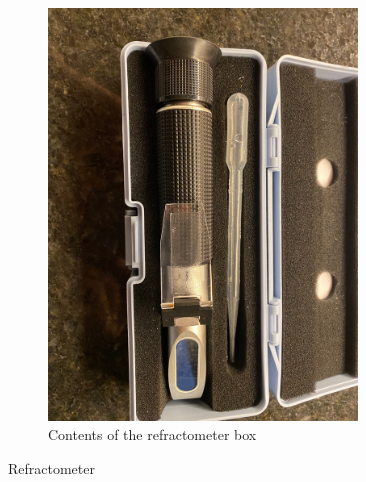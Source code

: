 \documentclass{report}
\begin{document}
\begin{enumerate}
\begin{enumerate}[I]
\begin{figure}[H]
\begin{subfigure}{0.5\textwidth}
                \includegraphics[width=0.9\textwidth]{RefractometerInBox.jpg}
                \caption{Contents of the refractometer box}
            \end{subfigure}
            \caption{Refractometer}
        \end{figure}
        

\end{enumerate}
\end{enumerate}
\end{document}
